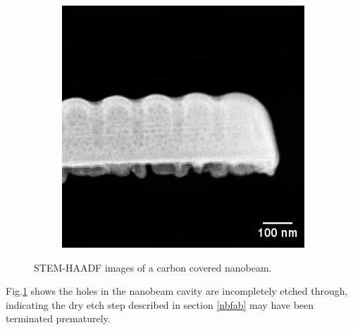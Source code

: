 \begin{figure}[h]
\begin{subfigure}[b]{0.35\textwidth}
	\end{subfigure}%
	\hspace*{2cm}
	\begin{subfigure}[b]{0.35\textwidth}
		\centering
		\includegraphics[width=1\linewidth]{Figs/Ch5/nb1}
		\caption{}
	\end{subfigure}%
	
	\caption{STEM-HAADF images of a carbon covered nanobeam.}
	\label{carbonnb}
\end{figure}
\FloatBarrier

Fig.\ref{carbonnb} shows the holes in the nanobeam cavity are incompletely etched through, indicating the dry etch step described in section \ref{nbfab} may have been terminated prematurely. 
